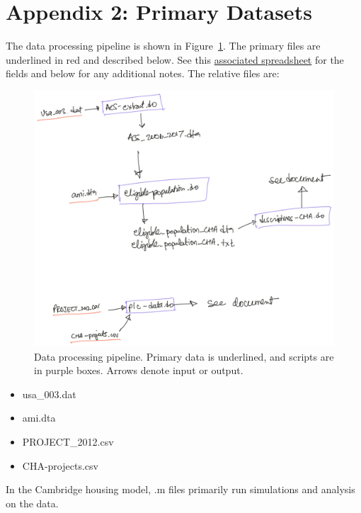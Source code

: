 \documentclass[11pt]{article}
\begin{document}
\section{Appendix 2: Primary Datasets}
The data processing pipeline is shown in Figure~\ref{fig:datapipeline}. The primary files are underlined in red  and described below. See this \href{https://docs.google.com/spreadsheets/d/1rT5IQdjf1eXFhCbJFr7dV0yZLzTJhNmbBcI5qajiMEw/edit#gid=555949214}{associated  spreadsheet} for the fields and below for any additional notes. The relative files are:

\begin{figure}
    \centering
    \includegraphics[width=1\linewidth]{doc/archive/data_processing_pipeline.png}
    \caption{Data processing pipeline. Primary data is underlined, and scripts are in purple boxes. Arrows denote input or output.}
    \label{fig:datapipeline}
\end{figure}
\begin{itemize}
    \item usa\_003.dat
    \item ami.dta
    \item PROJECT\_2012.csv
    \item CHA-projects.csv
\end{itemize}
In the Cambridge housing model, .m files primarily run simulations and analysis on the data. 

\newpage

 
\end{document}
